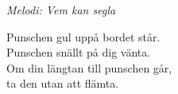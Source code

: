 {\footnotesize\textit{Melodi: Vem kan segla}}\par
\vspace{10pt}
Punschen gul uppå bordet står.\\
Punschen snällt på dig vänta.\\
Om din längtan till punschen går,\\
ta den utan att flämta.
